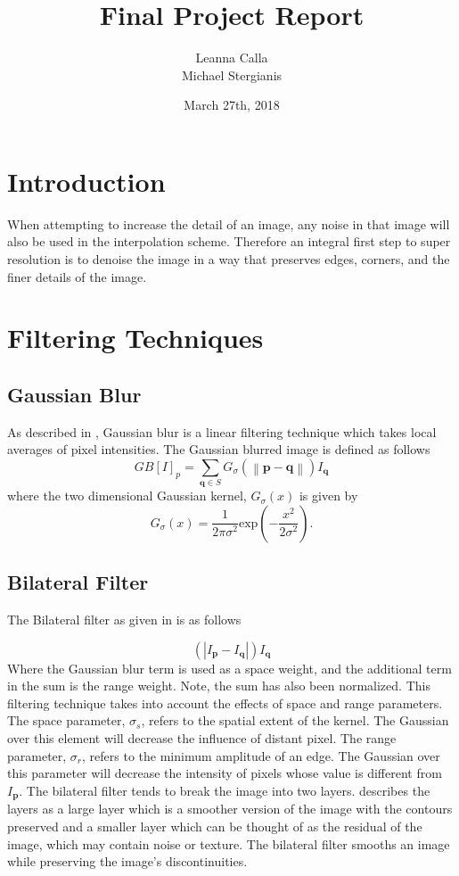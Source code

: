 \documentclass{article}
\title{Final Project Report}
\author{Leanna Calla \\ Michael Stergianis}
\date{March 27th, 2018}
\newcommand{\norm}[1]{\left\| #1 \right\|}
\begin{document}
\maketitle
%
\section{Introduction}
\begin{flushleft}
  When attempting to increase the detail of an image, any noise in
  that image will also be used in the interpolation scheme. Therefore
  an integral first step to super resolution is to denoise the image
  in a way that preserves edges, corners, and the finer details of the
  image.
\end{flushleft}
%
\section{Filtering Techniques}



\subsection{Gaussian Blur}
As described in \cite{bilateral}, Gaussian blur is a linear filtering
technique which takes local averages of pixel intensities. The
Gaussian blurred image is defined as follows
\[GB[I]_p = \displaystyle \sum_{\textbf{q} \in S}G_{\sigma} \left(
    \norm{\textbf{p} - \textbf{q}}\right)I_{\textbf{q}} \]
where the two dimensional Gaussian kernel, $G_{\sigma}(x)$ is given by
\[G_{\sigma}(x) = \frac{1}{2 \pi \sigma^2} \text{exp} \left(-
    \frac{x^2}{2 \sigma^2}\right). \]

\subsection{Bilateral Filter}
The Bilateral filter as given in \cite{Faisal-bilateral} is as follows

\[  \left(|I_{\textbf{p}} - I_{\textbf{q}}|\right)I_{\textbf{q}} \]
Where the Gaussian blur term is used as a space weight, and the
additional term in the sum is the range weight. Note, the sum has also
been normalized. This filtering technique takes into account the
effects of space and range parameters. The space parameter,
$\sigma_s$, refers to the spatial extent of the kernel. The Gaussian
over this element will decrease the influence of distant pixel. The
range parameter, $\sigma_r$, refers to the minimum amplitude of an
edge. The Gaussian over this parameter will decrease the intensity of
pixels whose value is different from $I_{\textbf{p}}$. The bilateral
filter tends to break the image into two layers. \cite{bilateral}
describes the layers as a large layer which is a smoother version of
the image with the contours preserved and a smaller layer which can be
thought of as the residual of the image, which may contain noise or
texture. The bilateral filter smooths an image while preserving the
image's discontinuities. 
\end{document}

